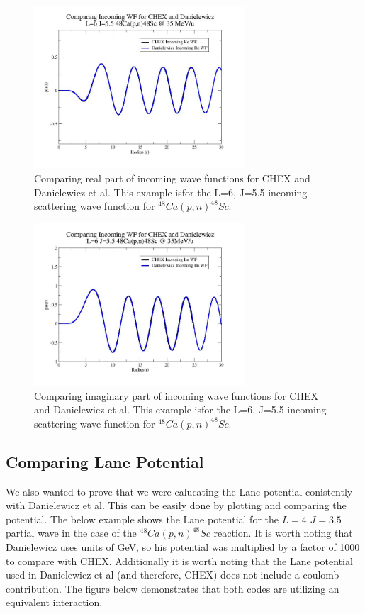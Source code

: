 \documentclass{article}
\begin{document}
\begin{figure}[H]
	\centering 
    \includegraphics[width=0.7\textwidth]{InWfComp.jpg}
    \caption{Comparing real part of incoming wave functions for CHEX and Danielewicz et al.  This example isfor the L=6, J=5.5 incoming scattering wave function for $^{48}Ca(p,n)^{48}Sc$.}
    \label{fig:inwfcompare}
\end{figure}

\begin{figure}[H]
	\centering 
    \includegraphics[width=0.7\textwidth]{ImWFComp.jpg}
    \caption{Comparing imaginary part of incoming wave functions for CHEX and Danielewicz et al.  This example isfor the L=6, J=5.5 incoming scattering wave function for $^{48}Ca(p,n)^{48}Sc$.}
    \label{fig:imwfcompare}
\end{figure}

\subsection{Comparing Lane Potential}

We also wanted to prove that we were calucating the Lane potential conistently with Danielewicz et al.  This can be easily done by plotting and comparing the potential.  The below example shows the Lane potential for the $L=4$ $J=3.5$ partial wave in the case of the $^{48}Ca(p,n)^{48}Sc$ reaction.  It is worth noting that Danielewicz uses units of GeV, so his potential was multiplied by a factor of 1000 to compare with CHEX.  Additionally it is worth noting that the Lane potential used in Danielewicz et al (and therefore, CHEX) does not include a coulomb contribution.  The figure below demonstrates that both codes are utilizing an equivalent interaction.
\end{document}
